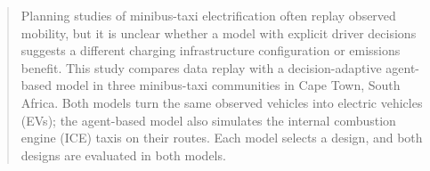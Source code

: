 \documentclass{elsarticle}
\newcommand{\MR}{\ensuremath{M_R}}
\newcommand{\MA}{\ensuremath{M_A}}
\begin{document}
\begin{frontmatter}
\begin{abstract}
    Planning studies of minibus-taxi electrification often replay observed mobility, but it is unclear whether a model with explicit driver decisions suggests a different charging infrastructure configuration or emissions benefit. This study compares data replay with a decision-adaptive agent-based model in three minibus-taxi communities in Cape Town, South Africa. Both models turn the same observed vehicles into electric vehicles (EVs); the agent-based model also simulates the internal combustion engine (ICE) taxis on their routes. Each model selects a design, and both designs are evaluated in both models.


\end{abstract}
\end{frontmatter}
\end{document}
